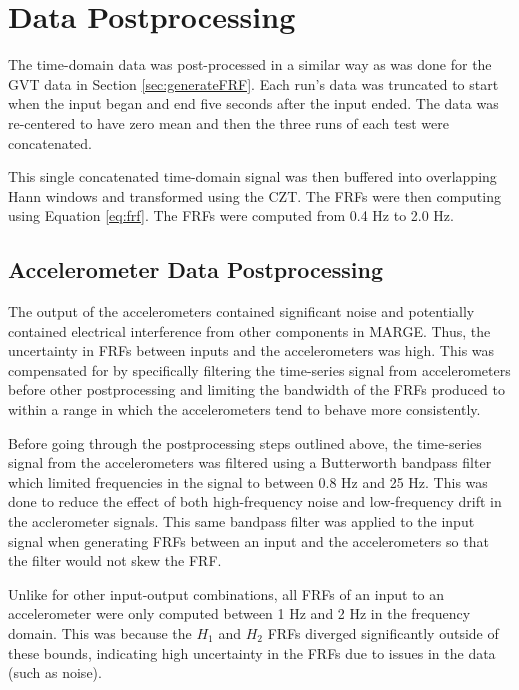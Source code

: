 \section{Data Postprocessing} %

The time-domain data was post-processed in a similar way as was done for the GVT data in Section \ref{sec:generateFRF}. Each run's data was truncated to start when the input began and end five seconds after the input ended. The data was re-centered to have zero mean and then the three runs of each test were concatenated.

This single concatenated time-domain signal was then buffered into overlapping Hann windows and transformed using the CZT. The FRFs were then computing using Equation \ref{eq:frf}. The FRFs were computed from 0.4 Hz to 2.0 Hz.

\subsection{Accelerometer Data Postprocessing} %

The output of the accelerometers contained significant noise and potentially contained electrical interference from other components in MARGE. Thus, the uncertainty in FRFs between inputs and the accelerometers was high. This was compensated for by specifically filtering the time-series signal from accelerometers before other postprocessing and limiting the bandwidth of the FRFs produced to within a range in which the accelerometers tend to behave more consistently.

Before going through the postprocessing steps outlined above, the time-series signal from the accelerometers was filtered using a Butterworth bandpass filter which limited frequencies in the signal to between 0.8 Hz and 25 Hz. This was done to reduce the effect of both high-frequency noise and low-frequency drift in the acclerometer signals. This same bandpass filter was applied to the input signal when generating FRFs between an input and the accelerometers so that the filter would not skew the FRF.

Unlike for other input-output combinations, all FRFs of an input to an accelerometer were only computed between 1 Hz and 2 Hz in the frequency domain. This was because the $H_1$ and $H_2$ FRFs diverged significantly outside of these bounds, indicating high uncertainty in the FRFs due to issues in the data (such as noise).